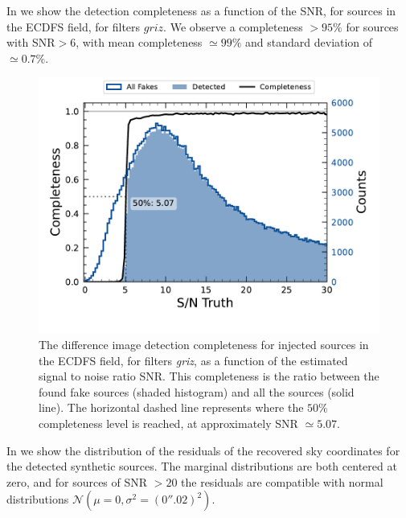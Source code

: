 In  we show the detection completeness as a function of the \gls{SNR}, for sources in the \gls{ECDFS} field, for filters $griz$. 
We observe a completeness $>95\%$ for sources with \gls{SNR}$> 6$, with mean completeness $\simeq 99\%$ and standard deviation of $\simeq 0.7\%$.
%
\begin{figure}[htb!]
\includegraphics[width=\linewidth]{efficiency_snr_griz}
\caption{The difference image detection completeness for injected sources in the \gls{ECDFS} field, for filters \textit{griz}, as a function of the estimated signal to noise ratio SNR. 
This completeness is the ratio between the found fake sources (shaded histogram) and all the sources (solid line). 
The horizontal dashed line represents where the $50\%$ completeness level is reached, at approximately SNR $\simeq 5.07$.}
\label{fig:eff_snr_griz}
\end{figure}
%
In  we show the distribution of the residuals of the recovered sky coordinates for the detected synthetic sources. The marginal distributions are both centered at zero, and for sources of SNR $>20$ the residuals are compatible with normal distributions $\mathcal{N}(\mu=0, \sigma^2=(0''.02)^2)$.
%
